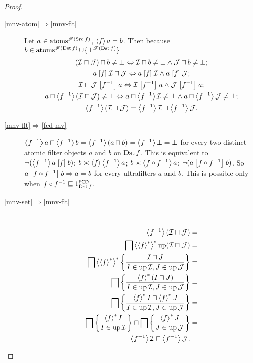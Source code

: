 \begin{proof}
~
\begin{description}
\item [{\ref{mnv-atom}$\Rightarrow$\ref{mnv-flt}}] Let
$a\in\operatorname{atoms}^{\mathscr{F}(\operatorname{Src} f)}$,
$\left\langle f\right\rangle a=b$. Then because $b\in\operatorname{atoms}^{\mathscr{F}(\operatorname{Dst}
f)}\cup\{\bot^{\mathscr{F}(\operatorname{Dst} f)}\}$
\begin{gather*}
(\mathcal{I}\sqcap\mathcal{J})\sqcap b\ne\bot \Leftrightarrow
\mathcal{I}\sqcap b\ne\bot\land\mathcal{J}\sqcap b\ne\bot;\\
a\mathrel{\left[f\right]}\mathcal{I}\sqcap\mathcal{J}\Leftrightarrow a\mathrel{\left[f\right]}\mathcal{I}\land
a\mathrel{\left[f\right]}\mathcal{J};\\
\mathcal{I}\sqcap\mathcal{J}\mathrel{\left[f^{-1}\right]}a\Leftrightarrow\mathcal{I}\mathrel{\left[f^
{-1}\right]}a\land\mathcal{J}\mathrel{\left[f^{-1}\right]}a;\\
a\sqcap\left\langle f^{-1}\right\rangle(\mathcal{I}\sqcap\mathcal{J})\ne\bot
\Leftrightarrow a\sqcap\left\langle f^{-1}\right\rangle\mathcal{I}\ne\bot
\land a\sqcap\left\langle f^{-1}\right\rangle\mathcal{J}\ne\bot;\\
\left\langle f^{-1}\right\rangle(\mathcal{I}\sqcap\mathcal{J})=\left\langle f^{-1}\right\rangle\mathcal{I}
\sqcap\left\langle f^{-1}\right\rangle\mathcal{J}.
\end{gather*}

\item [{\ref{mnv-flt}$\Rightarrow$\ref{fcd-mv}}]
$\left\langle f^{-1}\right\rangle a\sqcap\left\langle f^{-1}\right\rangle b=\left\langle f^{-1}\right\rangle(a\sqcap
b)=\left\langle f^{-1}\right\rangle\bot=\bot$
for every two distinct atomic filter objects $a$ and $b$ on $\operatorname{Dst} f$.
This is equivalent to $\lnot(\left\langle f^{-1}\right\rangle a\mathrel{\left[f\right]}b)$; $b\asymp\left\langle f\right\rangle\left\langle f^{-1}\right\rangle a$;
$b\asymp\left\langle f\circ f^{-1}\right\rangle a$; $\lnot(a\mathrel{\left[f\circ f^{-1}\right]}b)$.
So $a\mathrel{\left[f\circ f^{-1}\right]}b\Rightarrow a=b$ for every ultrafilters
$a$ and $b$. This is possible only when $f\circ f^{-1}\sqsubseteq1_{\operatorname{Dst}
f}^{\mathsf{FCD}}$.
\item [{\ref{mnv-set}$\Rightarrow$\ref{mnv-flt}}] ~
\begin{align*}
\left\langle f^{-1}\right\rangle(\mathcal{I}\sqcap\mathcal{J}) & =\\
\bigsqcap\left\langle \left\langle f\right\rangle ^{\ast}\right\rangle ^{\ast}\operatorname{up}(\mathcal{I}\sqcap\mathcal{J}) & =\\
\bigsqcap\left\langle \left\langle f\right\rangle ^{\ast}\right\rangle ^{\ast}\left\{ \frac{I\sqcap
J}{I\in\operatorname{up}\mathcal{I},J\in\operatorname{up}\mathcal{J}}\right\} & =\\
\bigsqcap\left\{ \frac{\left\langle f\right\rangle ^{\ast}(I\sqcap J)}{I\in\operatorname{up}\mathcal{I},J\in\operatorname{up}\mathcal{J}}\right\}
& =\\
\bigsqcap\left\{ \frac{\left\langle f\right\rangle ^{\ast}I\sqcap\left\langle f\right\rangle ^{\ast}J}{I\in\operatorname{up}\mathcal{I},J\in\operatorname{up}\mathcal{J}}\right\} & =\\
\bigsqcap\left\{ \frac{\left\langle f\right\rangle ^{\ast}I}{I\in\operatorname{up}\mathcal{I}}\right\}\sqcap\bigsqcap\left\{ \frac{\left\langle f\right\rangle ^{\ast}J}{J\in\operatorname{up}\mathcal{J}}\right\}
& =\\
\left\langle f^{-1}\right\rangle\mathcal{I}\sqcap\left\langle f^{-1}\right\rangle\mathcal{J}.
\end{align*}


\end{description}
\end{proof}
